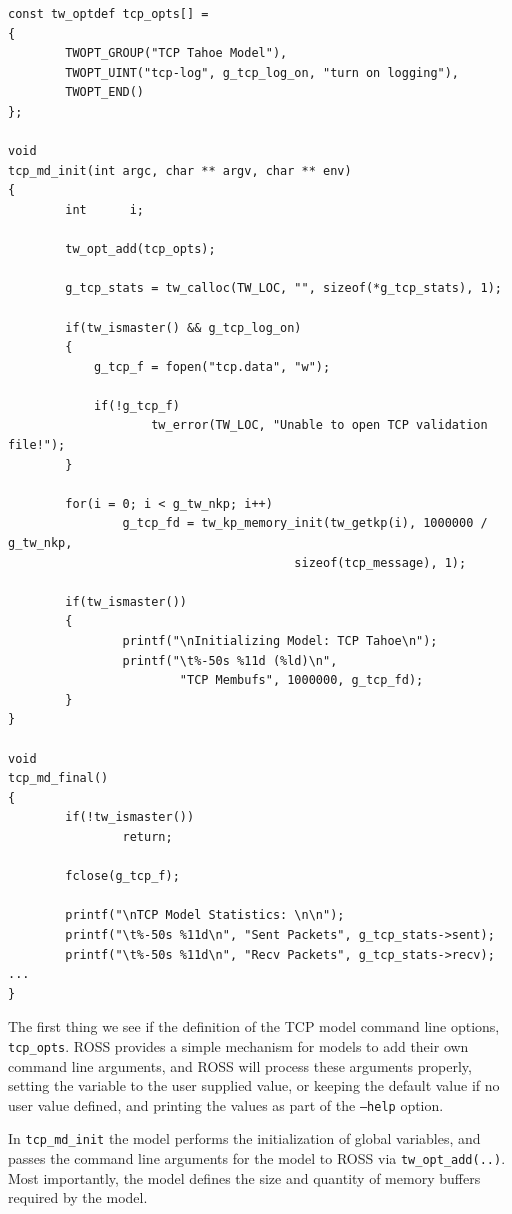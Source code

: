 \documentclass[12pt]{article}
\begin{document}
\begin{small}
\begin{verbatim}
const tw_optdef tcp_opts[] =
{
        TWOPT_GROUP("TCP Tahoe Model"),
        TWOPT_UINT("tcp-log", g_tcp_log_on, "turn on logging"),
        TWOPT_END()
};

void
tcp_md_init(int argc, char ** argv, char ** env)
{
        int      i;

        tw_opt_add(tcp_opts);

        g_tcp_stats = tw_calloc(TW_LOC, "", sizeof(*g_tcp_stats), 1);

        if(tw_ismaster() && g_tcp_log_on)
        {
            g_tcp_f = fopen("tcp.data", "w");

            if(!g_tcp_f)
                    tw_error(TW_LOC, "Unable to open TCP validation file!");
        }
        
        for(i = 0; i < g_tw_nkp; i++)
                g_tcp_fd = tw_kp_memory_init(tw_getkp(i), 1000000 / g_tw_nkp,
                                        sizeof(tcp_message), 1);

        if(tw_ismaster())
        {
                printf("\nInitializing Model: TCP Tahoe\n");
                printf("\t%-50s %11d (%ld)\n",
                        "TCP Membufs", 1000000, g_tcp_fd);
        }
}

void
tcp_md_final()
{
        if(!tw_ismaster())
                return;

        fclose(g_tcp_f);
        
        printf("\nTCP Model Statistics: \n\n");
        printf("\t%-50s %11d\n", "Sent Packets", g_tcp_stats->sent);
        printf("\t%-50s %11d\n", "Recv Packets", g_tcp_stats->recv);
...
}
\end{verbatim}
\end{small}
 
The first thing we see if the definition of the TCP model command line
options, {\tt tcp\_opts}.  ROSS provides a simple mechanism for models to add
their own command line arguments, and ROSS will process these arguments
properly, setting the variable to the user supplied value, or keeping the
default value if no user value defined, and printing the values as part of the
{\tt --help} option.

In {\tt tcp\_md\_init} the model performs the initialization of global
variables, and passes the command line arguments for the model to ROSS via
{\tt tw\_opt\_add(..)}.  Most importantly, the model defines the size and
quantity of memory buffers required by the model.
\end{document}
